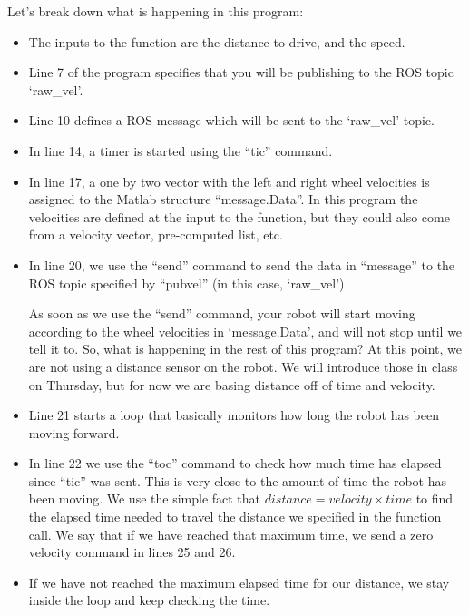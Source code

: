 \documentclass[M3_Night2_Solutions]{subfiles}
\begin{document}
Let's break down what is happening in this program:
\begin{itemize}
\item The inputs to the function are the distance to drive, and the speed.
\item Line 7 of the program specifies that you will be publishing to the ROS topic `raw\_vel'. 
\item Line 10 defines a ROS message which will be sent to the `raw\_vel' topic. 
\item In line 14, a timer is started using the ``tic'' command.
\item In line 17, a one by two vector with the left and right wheel velocities is assigned to the Matlab structure ``message.Data''. In this program the velocities are defined at the input to the function, but they could also come from a velocity vector, pre-computed list, etc.
\item In line 20, we use the ``send'' command to send the data in ``message'' to the ROS topic specified by ``pubvel'' (in this case, `raw\_vel')

As soon as we use the ``send'' command, your robot will start moving according to the wheel velocities in `message.Data', and will not stop until we tell it to.  So, what is happening in the rest of this program? At this point, we are not using a distance sensor on the robot. We will introduce those in class on Thursday, but for now we are basing distance off of time and velocity.

\item Line 21 starts a loop that basically monitors how long the robot has been moving forward. 
\item In line 22 we use the ``toc'' command to check how much time has elapsed since ``tic'' was sent. This is very close to the amount of time the robot has been moving. We use the simple fact that $distance=velocity\times time$ to find the elapsed time needed to travel the distance we specified in the function call. We say that if we have reached that maximum time, we send a zero velocity command in lines 25 and 26.
\item If we have not reached the maximum elapsed time for our distance, we stay inside the loop and keep checking the time.

\end{itemize}


%
\end{document}
